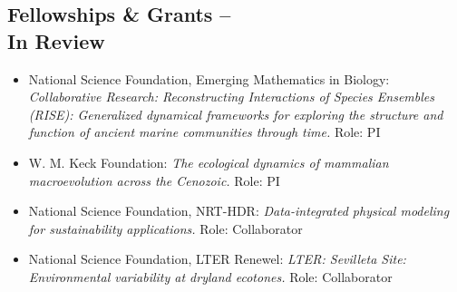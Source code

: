 \documentclass[margin,line,12pt]{res}
\begin{document}
\begin{resume}

\section{\sc Fellowships \& Grants -- \\  In Review}
\begin{itemize}
\item National Science Foundation, Emerging Mathematics in Biology: \emph{Collaborative Research: Reconstructing Interactions of Species Ensembles (RISE): Generalized dynamical frameworks for exploring the structure and function of ancient marine communities through time.} Role: PI






\item W. M. Keck Foundation: \emph{The ecological dynamics of mammalian macroevolution across the Cenozoic.} Role: PI


\item National Science Foundation, NRT-HDR: \emph{Data-integrated physical modeling for sustainability applications.} Role: Collaborator


\item National Science Foundation, LTER Renewel: \emph{LTER: Sevilleta Site: Environmental variability at dryland ecotones.} Role: Collaborator
\end{itemize}





\end{resume}
\end{document}
